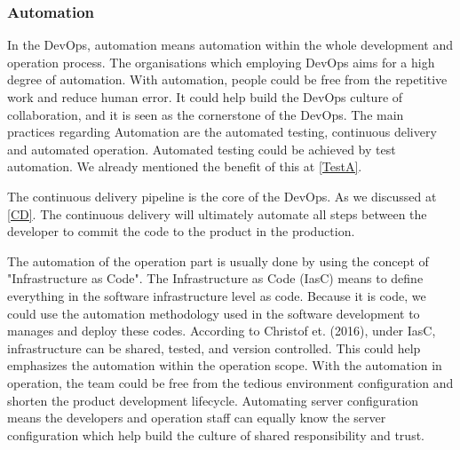 \subsubsection[]{Automation}
In the DevOps, automation means 
automation within the whole development and operation process. The organisations which employing DevOps aims for a high degree of automation.\cite{erich2017qualitative} 
With automation, people could be free from the repetitive work and reduce human error. It could help build the DevOps culture of collaboration, and it is seen as the cornerstone of the DevOps.\cite{DevOpsCu76:online}
The main practices regarding Automation are the automated testing, continuous delivery and automated operation. Automated testing could be achieved by test automation. We already mentioned the benefit of this at \ref{TestA}.
\par
The continuous delivery pipeline is the core of the DevOps.\cite{gill2018devops} As we discussed at \ref{CD}. The continuous delivery will ultimately automate all steps between the developer to commit the code to the product in the production.
\par
\label{iasc}
The automation of the operation part is usually done by using the concept of "Infrastructure as Code"\cite{lwakatare2015dimensions}. The Infrastructure as Code (IasC) means to define everything in the software infrastructure level as code.\cite{artac2017devops} Because it is code, we could use the automation methodology used in the software development to manages and deploy these codes. According to Christof et. (2016), under IasC, infrastructure can be shared, tested, and version controlled. \cite{ebert2016devops} This could help emphasizes the automation within the operation scope. With the automation in operation, the team could be free from the tedious environment configuration and shorten the product development lifecycle. Automating server configuration means the developers and operation staff can equally know the server configuration \cite{DevOpsCu76:online} which help build the culture of shared responsibility and trust.
